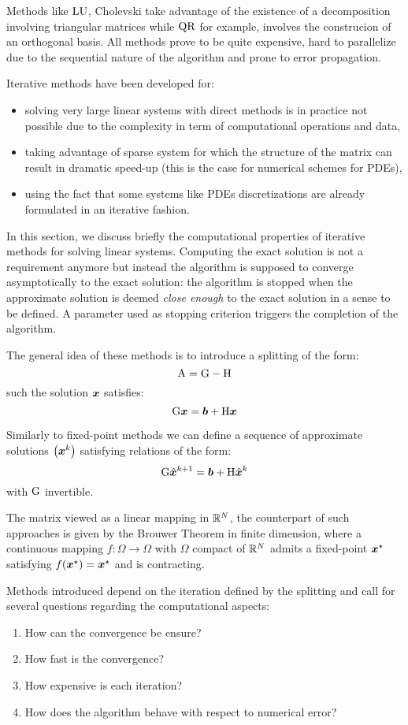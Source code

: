 Methods like ${\mathrm L}{\mathrm U}$, Cholevski take advantage of the existence of a decomposition involving triangular matrices while ${\mathrm Q}{\mathrm R}$ for example, involves the construcion of an orthogonal basis.
All methods prove to be quite expensive, hard to parallelize due to the sequential nature of the algorithm and prone to error propagation.

Iterative methods have been developed for:
\begin{itemize}
\item solving very large linear systems with direct methods is in practice not possible due to the complexity in term of computational operations and data,
\item taking advantage of sparse system for which the structure of the matrix can result in dramatic speed-up (this is the case for numerical schemes for PDEs),
\item using the fact that some systems like PDEs discretizations are already formulated in an iterative fashion.
\end{itemize}

\medskip
In this section, we discuss briefly the computational properties of iterative methods for solving linear systems.
Computing the exact solution is not a requirement anymore but instead the algorithm is supposed to converge asymptotically to the exact solution: the algorithm is stopped when the approximate solution is deemed \textit{close enough} to the exact solution in a sense to be defined.
A parameter used as stopping criterion triggers the completion of the algorithm.

\medskip
The general idea of these methods is to introduce a splitting of the form:
\[
{\mathrm A} = {\mathrm G} - {\mathrm H}
\]
such the solution ${\boldsymbol x}$ satisfies:
\[
{\mathrm G} {\boldsymbol x} = {\boldsymbol b} + {\mathrm H} {\boldsymbol x}
\]

Similarly to fixed-point methods we can define a sequence of approximate solutions $\bigl({\boldsymbol x}^k\bigr)$ satisfying relations of the form:
\[
{\mathrm G} \hat{\boldsymbol x}^{k+1} = {\boldsymbol b} + {\mathrm H} \hat{\boldsymbol x}^{k}
\]
with ${\mathrm G}$ invertible.

The matrix viewed as a linear mapping in ${\mathbb{R}^N}$, the counterpart of such approaches is given by the Brouwer Theorem in finite dimension, where a continuous mapping $f : \Omega \rightarrow \Omega$ with $\Omega$ compact of ${\mathbb{R}^N}$ admits a fixed-point ${\boldsymbol x}^\star$ satisfying $f({\boldsymbol x}^\star) = {\boldsymbol x}^\star$ and is contracting.

\medskip
Methods introduced depend on the iteration defined by the splitting and call for several questions regarding the computational aspects:
\begin{enumerate}
\item How can the convergence be ensure?
\item How fast is the convergence?
\item How expensive is each iteration?
\item How does the algorithm behave with respect to numerical error?
\end{enumerate}

